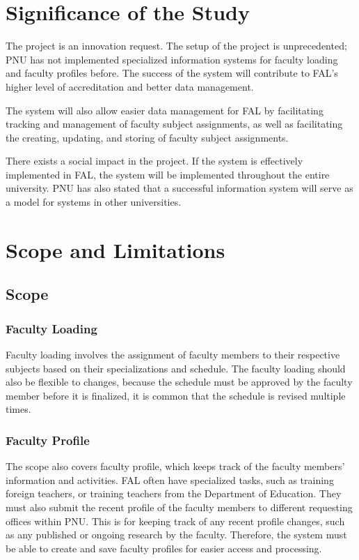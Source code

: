 \section{Significance of the Study}
The project is an innovation request. The setup of the project is unprecedented; PNU has not implemented specialized information systems for faculty loading and faculty profiles before. The success of the system will contribute to FAL’s higher level of accreditation and better data management.

The system will also allow easier data management for FAL by facilitating tracking and management of faculty subject assignments, as well as facilitating the creating, updating, and storing of faculty subject assignments. 

There exists a social impact in the project. If the system is effectively implemented in FAL, the system will be implemented throughout the entire university. PNU has also stated that a successful information system will serve as a model for systems in other universities.

\section{Scope and Limitations}

\subsection{Scope}

\subsubsection{Faculty Loading}
Faculty loading involves the assignment of faculty members to their respective subjects based on their specializations and schedule. The faculty loading should also be flexible to changes, because the schedule must be approved by the faculty member before it is finalized, it is common that the schedule is revised multiple times. 

\subsubsection{Faculty Profile}
The scope also covers faculty profile, which keeps track of the faculty members' information and activities. FAL often have specialized tasks, such as training foreign teachers, or training teachers from the Department of Education. They must also submit the recent profile of the faculty members to different requesting offices within PNU. This is for keeping track of any recent profile changes, such as any published or ongoing research by the faculty. Therefore, the system must be able to create and save faculty profiles for easier access and processing.

